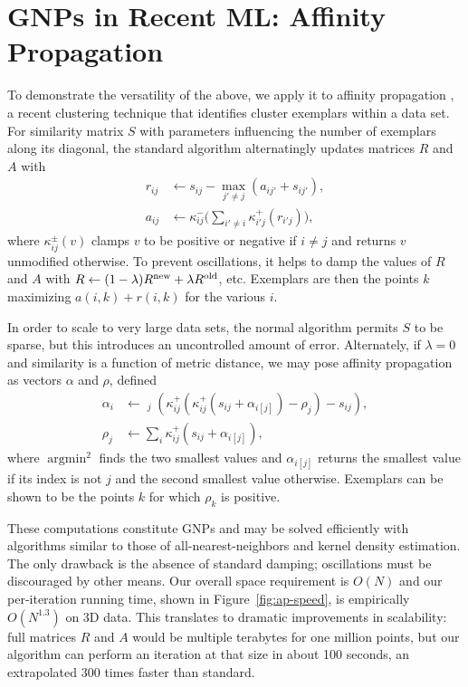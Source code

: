 \documentclass[twoside,leqno,twocolumn]{article}
\DeclareMathOperator*{\argmin}{argmin}
\begin{document}
\section{GNPs in Recent ML: Affinity Propagation}
To demonstrate the versatility of the above, we apply it to affinity
propagation \cite{affinity}, a recent clustering technique that
identifies cluster exemplars within a data set.  For similarity matrix
$S$ with parameters influencing the number of exemplars along its
diagonal, the standard algorithm alternatingly updates matrices $R$
and $A$ with
\begin{align}
  r_{ij} & \gets s_{ij} - \max_{j' \neq j} (a_{ij'} + s_{ij'}) , \\
  a_{ij} & \gets \kappa^-_{ij} \Big( \sum_{i' \neq i} \kappa^+_{i'j}(r_{i'j}) \Big) ,
\end{align}
where $\kappa^{\pm}_{ij}(v)$ clamps $v$ to be positive or negative if
$i \neq j$ and returns $v$ unmodified otherwise.  To prevent
oscillations, it helps to damp the values of $R$ and $A$ with $R \gets
(1 - \lambda) R^{\rm new} + \lambda R^{\rm old}$, etc.  Exemplars are
then the points $k$ maximizing $a(i,k) + r(i,k)$ for the various $i$.

In order to scale to very large data sets, the normal algorithm
permits $S$ to be sparse, but this introduces an uncontrolled amount
of error.  Alternately, if $\lambda = 0$ and similarity is a function
of metric distance, we may pose affinity propagation as vectors
$\alpha$ and $\rho$, defined
\begin{align}
  \alpha_i & \gets \mathop{\argmin\nolimits^2}_j (\kappa^+_{ij}(\kappa^+_{ij}(s_{ij} + \alpha_{i[j]}) - \rho_j) - s_{ij}) , \\
  \rho_j & \gets \sum_i \kappa^+_{ij}(s_{ij} + \alpha_{i[j]}) ,
\end{align}
where $\argmin\nolimits^2$ finds the two smallest values and
$\alpha_{i[j]}$ returns the smallest value if its index is not $j$ and
the second smallest value otherwise.  Exemplars can be shown to be the
points $k$ for which $\rho_k$ is positive.

These computations constitute GNPs and may be solved efficiently with
algorithms similar to those of all-nearest-neighbors and kernel
density estimation.  The only drawback is the absence of standard
damping; oscillations must be discouraged by other means.  Our overall
space requirement is $O(N)$ and our per-iteration running time, shown
in Figure~\ref{fig:ap-speed}, is empirically $O(N^{1.3})$ on 3D data.
This translates to dramatic improvements in scalability: full matrices
$R$ and $A$ would be multiple terabytes for one million points, but
our algorithm can perform an iteration at that size in about 100
seconds, an extrapolated 300 times faster than standard.
\end{document}
